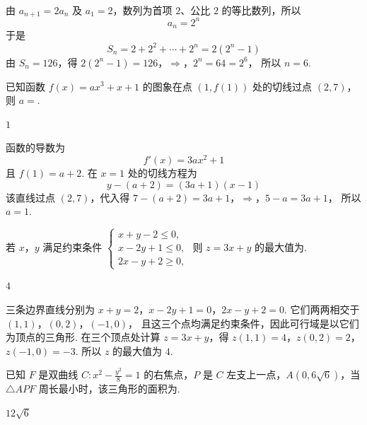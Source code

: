 \begin{solution}
由 \(a_{n+1}=2a_n\) 及 \(a_1=2\)，数列为首项 \(2\)、公比 \(2\) 的等比数列，所以
\[
a_n=2^n
\]
于是
\[
S_n=2+2^2+\cdots+2^n=2(2^n-1)
\]
由 \(S_n=126\)，得
\(2(2^n-1)=126\)，\(\Longrightarrow\)，\(2^n=64=2^6\)，
所以 \(n=6\).
\end{solution}

\begin{problem}
已知函数 \( f(x) = ax^3 + x + 1 \) 的图象在点 \((1, f(1))\) 处的切线过点 \((2, 7)\)，则 \( a = \)\fillinblank{}.
\end{problem}

\begin{answer}
\(1\)
\end{answer}

\begin{solution}
函数的导数为
\[
f'(x)=3ax^2+1
\]
且 \(f(1)=a+2\). 在 \(x=1\) 处的切线方程为
\[
y-(a+2)=(3a+1)(x-1)
\]
该直线过点 \((2,7)\)，代入得
\(7-(a+2)=3a+1\)，\(\Longrightarrow\)，\(5-a=3a+1\)，
所以 \(a=1\).
\end{solution}

\begin{problem}
若 \(x\)，\(y\) 满足约束条件 \(\begin{cases}
x + y - 2 \leqslant 0,\\
x - 2y + 1 \leqslant 0,\\
2x - y + 2 \geqslant 0,
\end{cases}\) 则 \(z = 3x + y\) 的最大值为\fillinblank{}.
\end{problem}

\begin{answer}
\(4\)
\end{answer}

\begin{solution}
三条边界直线分别为
\(x+y=2\)，\(x-2y+1=0\)，\(2x-y+2=0\).
它们两两相交于
\((1,1)\)，\((0,2)\)，\((-1,0)\)，
且这三个点均满足约束条件，因此可行域是以它们为顶点的三角形. 在三个顶点处计算 \(z=3x+y\)，得
\(z(1,1)=4\)，\(z(0,2)=2\)，\(z(-1,0)=-3\).
所以 \(z\) 的最大值为 \(4\).
\end{solution}

\begin{problem}
已知 \(F\) 是双曲线 \(C: x^{2} - \frac{y^{2}}{8} = 1\) 的右焦点，\(P\) 是 \(C\) 左支上一点，\(A(0,6\sqrt{6})\)，当 \(\triangle APF\) 周长最小时，该三角形的面积为\fillinblank{}.
\end{problem}

\begin{answer}
\(12\sqrt{6}\)
\end{answer}

